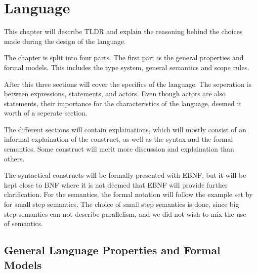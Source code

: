 \chapter{Language}\label{part:design}

This chapter will describe TLDR and explain the reasoning behind the choices made during the design of the language.

The chapter is split into four parts. The first part is the general properties and formal models. This includes the type system, general semantics and scope rules.

After this three sections will cover the specifics of the language. The seperation is between expressions, statements, and actors. Even though actors are also statements, their importance for the characteristics of the language, deemed it worth of a seperate section.

The different sections will contain explainations, which will mostly consist of an informal explaination of the construct, as well as the syntax and the formal semantics. Some construct will merit more discussion and explaination than others.

The syntactical constructs will be formally presented with EBNF, but it will be kept close to BNF where it is not deemed that EBNF will provide further clarification. For the semantics, the formal notation will follow the example set by  for small step semantics. The choice of small step semantics is done, since big step semantics can not describe parallelism, and we did not wish to mix the use of semantics.

\section{General Language Properties and Formal Models}







